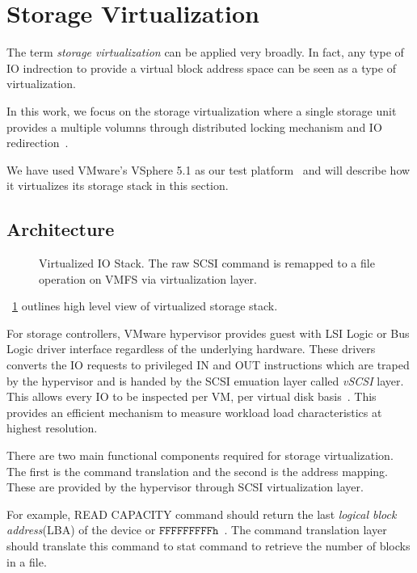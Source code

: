 \section{Storage Virtualization}
\label{VIRT}

The term \emph{storage virtualization} can be applied very broadly. 
In fact, any type of IO indrection to provide a virtual block address space can be seen as a type of virtualization.

In this work, we focus on the storage virtualization where a single storage unit provides a multiple volumns through distributed locking mechanism and IO redirection~\cite{vaghani:2010, gupta:2011, soltis:1996}.

We have used VMware's VSphere 5.1 as our test platform~\cite{vmware:2013} and will describe how it virtualizes its storage stack in this section.

\subsection{Architecture}

\begin{figure}[!t]
\centering

\label{fig:vio}
\caption{Virtualized IO Stack. The raw SCSI command is remapped to a file operation on VMFS via virtualization layer.}
\end{figure}

\figurename~\ref{fig:vio} outlines high level view of virtualized storage stack.

For storage controllers, VMware hypervisor provides guest with LSI Logic or Bus Logic driver interface regardless of the underlying hardware. 
These drivers converts the IO requests to privileged IN and OUT instructions which are traped by the hypervisor and is handed by the SCSI emuation layer called \emph{vSCSI} layer. 
This allows every IO to be inspected per VM, per virtual disk basis~\cite{ahmad:2007}. 
This provides an efficient mechanism to measure workload load characteristics at highest resolution.  

There are two main functional components required for storage virtualization.
The first is the command translation and the second is the address mapping. 
These are provided by the hypervisor through SCSI virtualization layer.

For example, READ CAPACITY command should return the last \emph{logical block address}(LBA) of the device or $\mathtt{FFFFFFFFFh}$~\cite{seagate:2006}. 
The command translation layer should translate this command to stat command to retrieve the number of blocks in a file. 

